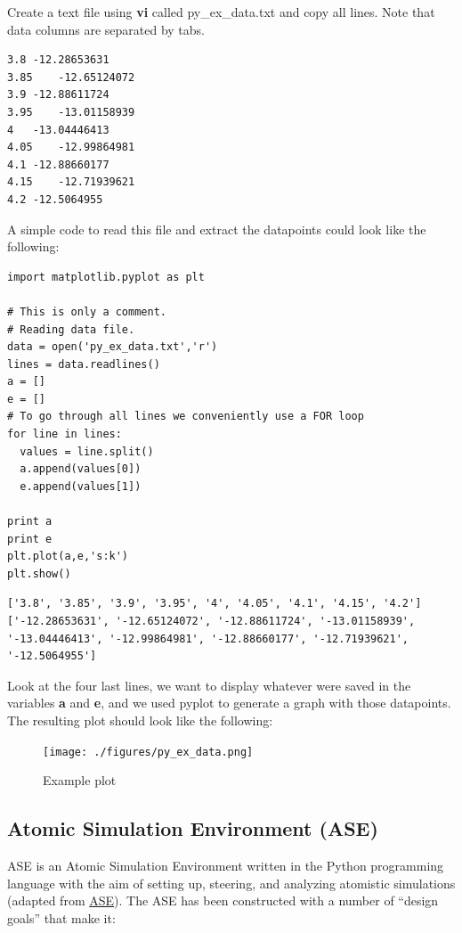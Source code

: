 \documentclass[11pt]{article}
\begin{document}
Create a text file using \textbf{vi} called py\_ex\_data.txt and copy all lines. Note that data columns are separated by tabs. 
\begin{verbatim}
3.8	-12.28653631
3.85	-12.65124072
3.9	-12.88611724
3.95	-13.01158939
4	-13.04446413
4.05	-12.99864981
4.1	-12.88660177
4.15	-12.71939621
4.2	-12.5064955
\end{verbatim}

A simple code to read this file and extract the datapoints could look like the following:
\begin{verbatim}
import matplotlib.pyplot as plt

# This is only a comment. 
# Reading data file.
data = open('py_ex_data.txt','r')
lines = data.readlines()
a = []
e = []
# To go through all lines we conveniently use a FOR loop
for line in lines:
  values = line.split()
  a.append(values[0])
  e.append(values[1])

print a
print e
plt.plot(a,e,'s:k')
plt.show()
\end{verbatim}

\begin{verbatim}
['3.8', '3.85', '3.9', '3.95', '4', '4.05', '4.1', '4.15', '4.2']
['-12.28653631', '-12.65124072', '-12.88611724', '-13.01158939', '-13.04446413', '-12.99864981', '-12.88660177', '-12.71939621', '-12.5064955']
\end{verbatim}

Look at the four last lines, we want to display whatever were saved in the variables \textbf{a} and \textbf{e}, and we used pyplot to generate a graph with those datapoints. The resulting plot should look like the following:

\begin{figure}[htb]
\centering
\texttt{[image: ./figures/py\_ex\_data.png]}
\caption{Example plot}
\end{figure}

\subsection{Atomic Simulation Environment (ASE)}
\label{sec-2-3}
ASE is an Atomic Simulation Environment written in the Python programming language with the aim of setting up, steering, and analyzing atomistic simulations (adapted from \href{https://wiki.fysik.dtu.dk/ase/about.html}{ASE}). The ASE has been constructed with a number of “design goals” that make it:
\end{document}
